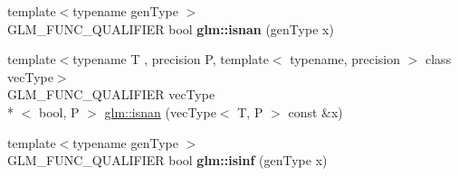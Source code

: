 \begin{DoxyCompactItemize}
\item 
\hypertarget{namespaceglm_afd4cba966f582de51d0957ed0abdb244}{{\footnotesize template$<$typename gen\-Type $>$ }\\G\-L\-M\-\_\-\-F\-U\-N\-C\-\_\-\-Q\-U\-A\-L\-I\-F\-I\-E\-R bool {\bfseries glm\-::isnan} (gen\-Type x)}\label{namespaceglm_afd4cba966f582de51d0957ed0abdb244}

\item 
{\footnotesize template$<$typename T , precision P, template$<$ typename, precision $>$ class vec\-Type$>$ }\\G\-L\-M\-\_\-\-F\-U\-N\-C\-\_\-\-Q\-U\-A\-L\-I\-F\-I\-E\-R vec\-Type\\*
$<$ bool, P $>$ \hyperlink{group__core__func__common_ga6cb8f202a52eed2331724a3800198ebf}{glm\-::isnan} (vec\-Type$<$ T, P $>$ const \&x)
\item 
\hypertarget{namespaceglm_a2c0ee7d7e149b7ddf60abb7b73845330}{{\footnotesize template$<$typename gen\-Type $>$ }\\G\-L\-M\-\_\-\-F\-U\-N\-C\-\_\-\-Q\-U\-A\-L\-I\-F\-I\-E\-R bool {\bfseries glm\-::isinf} (gen\-Type x)}\label{namespaceglm_a2c0ee7d7e149b7ddf60abb7b73845330}


\end{DoxyCompactItemize}
